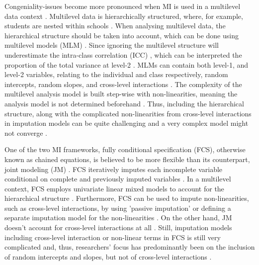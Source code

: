 \documentclass[10pt, a4paper, titlepage]{article}
\begin{document}
Congeniality-issues become more pronounced when MI is used in a multilevel data context \citep{mistlerComparisonJointModel2017, enders2018, enders2018a, enders2020, buurenFlexibleImputationMissing2018, taljaard2008, enders2016, resche-rigon2018, audigier2018, dong2023, grund2016, grund2018a, grund2018, ludtke2017, grund2021, quartagno2022}. Multilevel data is hierarchically structured, where, for example, students are nested within schools \citep{hox2017, hox2011}. When analysing multilevel data, the hierarchical structure should be taken into account, which can be done using multilevel models (MLM) \citep{hox2017, hox2011, ludtke2017}. Since ignoring the multilevel structure will underestimate the intra-class correlation (ICC) \citep{buurenFlexibleImputationMissing2018, ludtke2017, taljaard2008, hox2011}, which can be interpreted the proportion of the total variance at level-2 \citep{gulliford2005, shieh2012, hox2011}. MLMs can contain both level-1, and level-2 variables, relating to the individual and class respectively, random intercepts, random slopes, and cross-level interactions \citep{hox2017, hox2011}. The complexity of the multilevel analysis model is built step-wise with non-linearities, meaning the analysis model is not determined beforehand \citep{hox2017, hox2011}. Thus, including the hierarchical structure, along with the complicated non-linearities from cross-level interactions in imputation models can be quite challenging  \citep{buurenFlexibleImputationMissing2018, burgette2010, hox2011} and a very complex model might not converge \citep{buurenFlexibleImputationMissing2018}.

One of the two MI frameworks, fully conditional specification (FCS), otherwise known as chained equations, is believed to be more flexible than its counterpart, joint modeling (JM) \citep{audigier2018, burgette2010, vanbuuren2007, grund2018a}. FCS iteratively imputes each incomplete variable conditional on complete and previously imputed variables \citep{mistlerComparisonJointModel2017, buurenFlexibleImputationMissing2018, enders2016, enders2018, enders2018a, hughes2014, grund2018a}. In a multilevel context, FCS employs univariate linear mixed models to account for the hierarchical structure \citep{mistlerComparisonJointModel2017, enders2018, resche-rigon2018}. Furthermore, FCS can be used to impute non-linearities, such as cross-level interactions, by using 'passive imputation' or defining a separate imputation model for the non-linearities \citep{buurenFlexibleImputationMissing2018, grund2018}. On the other hand, JM doesn't account for cross-level interactions at all \citep{buurenFlexibleImputationMissing2018, grund2018}. Still, imputation models including cross-level interaction or non-linear terms in FCS is still very complicated \citep{grund2021, grund2018} and, thus, researchers' focus has predominantly been on the inclusion of random intercepts and slopes, but not of cross-level interactions \citep{grund2018a, grund2016, enders2018, enders2018a, enders2020, enders2016}.
\end{document}
